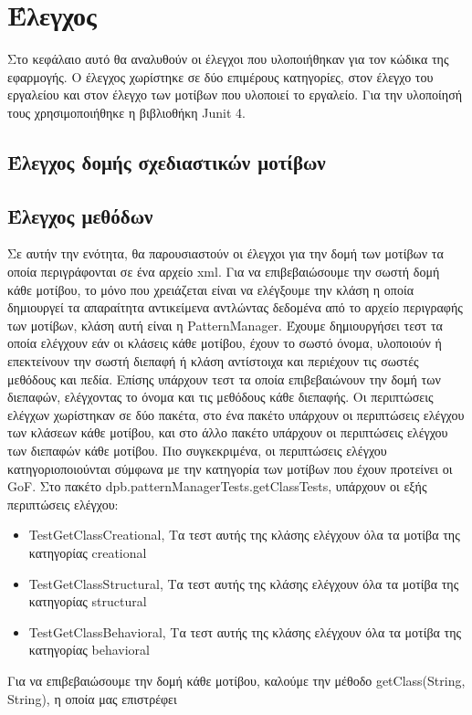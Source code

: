 \chapter{Έλεγχος}
\label{ch:testing}
Στο κεφάλαιο αυτό θα αναλυθούν οι έλεγχοι που υλοποιήθηκαν για τον κώδικα της εφαρμογής. 
Ο έλεγχος χωρίστηκε σε δύο επιμέρους κατηγορίες, στον έλεγχο του εργαλείου και στον έλεγχο των μοτίβων που υλοποιεί το εργαλείο.
Για την υλοποίησή τους χρησιμοποιήθηκε η βιβλιοθήκη Junit 4.
\section{Έλεγχος δομής σχεδιαστικών μοτίβων}
\label{sec:patternTesting}
\section{Έλεγχος μεθόδων}
\label{sec:patternManagerTesting}
Σε αυτήν την ενότητα, θα παρουσιαστούν οι έλεγχοι για την δομή των μοτίβων τα οποία περιγράφονται σε ένα αρχείο xml.
Για να επιβεβαιώσουμε την σωστή δομή κάθε μοτίβου, το μόνο που χρειάζεται είναι να ελέγξουμε την κλάση η οποία δημιουργεί 
τα απαραίτητα αντικείμενα αντλώντας δεδομένα από το αρχείο περιγραφής των μοτίβων, κλάση αυτή είναι η PatternManager.
Έχουμε δημιουργήσει τεστ τα οποία ελέγχουν εάν οι κλάσεις κάθε μοτίβου, έχουν το σωστό όνομα, υλοποιούν ή επεκτείνουν την σωστή 
διεπαφή ή κλάση αντίστοιχα και περιέχουν τις σωστές μεθόδους και πεδία. Επίσης υπάρχουν τεστ τα οποία επιβεβαιώνουν την δομή των 
διεπαφών, ελέγχοντας το όνομα και τις μεθόδους κάθε διεπαφής. Οι περιπτώσεις ελέγχων χωρίστηκαν σε δύο πακέτα, 
στο ένα πακέτο υπάρχουν οι περιπτώσεις ελέγχου των κλάσεων κάθε μοτίβου, και στο άλλο πακέτο υπάρχουν οι περιπτώσεις ελέγχου 
των διεπαφών κάθε μοτίβου. Πιο συγκεκριμένα, οι περιπτώσεις ελέγχου κατηγοριοποιούνται σύμφωνα με την 
κατηγορία των μοτίβων που έχουν προτείνει οι GoF. Στο πακέτο dpb.patternManagerTests.getClassTests, υπάρχουν οι εξής περιπτώσεις ελέγχου:
\begin{itemize}
    \item TestGetClassCreational, Τα τεστ αυτής της κλάσης ελέγχουν όλα τα μοτίβα της κατηγορίας creational
    \item TestGetClassStructural, Τα τεστ αυτής της κλάσης ελέγχουν όλα τα μοτίβα της κατηγορίας structural
    \item TestGetClassBehavioral, Τα τεστ αυτής της κλάσης ελέγχουν όλα τα μοτίβα της κατηγορίας behavioral
\end{itemize}
Για να επιβεβαιώσουμε την δομή κάθε μοτίβου, καλούμε την μέθοδο getClass(String, String), η οποία μας επιστρέφει 
